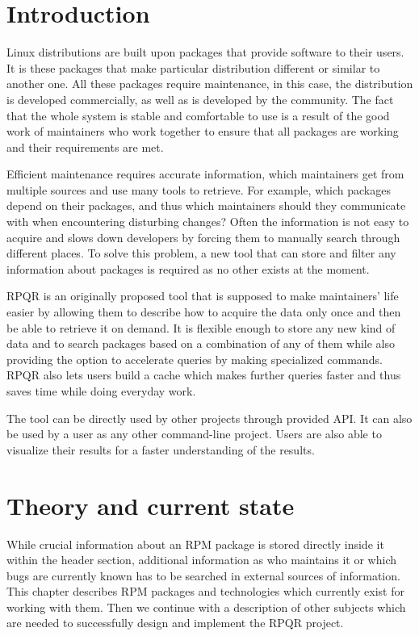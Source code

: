 \setlength{\parindent}{0em}
\setlength{\parskip}{1em}
\chapter{Introduction}

Linux distributions are built upon packages that provide software to their users. It is these
packages that make particular distribution different or similar to another one. All these packages require
maintenance, in this case, the distribution is developed commercially, as well as is developed by the community.
The fact that the whole system is stable and comfortable to use is a result of the good work of
maintainers who work together to ensure that all packages are working and their
requirements are met.

Efficient maintenance requires accurate information, which maintainers get from multiple sources
and use many tools to retrieve. For example, which packages depend on their packages, and thus which
maintainers should they communicate with when encountering disturbing changes? Often the information
is not easy to acquire and slows down developers by forcing them to manually search through different
places. To solve this problem, a new tool that can store and filter any information about
packages is required as no other exists at the moment.

RPQR is an originally proposed tool that is supposed to make maintainers' life easier by allowing them to describe how
to acquire the data only once and then be able to retrieve it on demand. It is flexible
enough to store any new kind of data and to search packages based on a combination of any of them while
also providing the option to accelerate queries by making specialized commands.
RPQR also lets users build a cache which makes further queries faster and thus saves time while
doing everyday work.

The tool can be directly used by other projects through provided API. It can also be used
by a user as any other command-line project. Users are also able to visualize their
results for a faster understanding of the results.

\chapter{Theory and current state}
While crucial information about an RPM package is stored directly inside it within the header section,
additional information as who maintains it or which bugs are currently known has to be searched
in external sources of information. This chapter describes RPM packages and technologies which
currently exist for working with them. Then we continue with a description of other subjects which are needed
to successfully design and implement the RPQR project.

